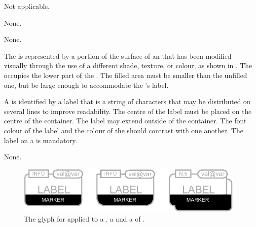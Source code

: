 \begin{glyphDescription}

\glyphSboTerm Not applicable.

\glyphIncoming
None.

\glyphOutgoing
None.

\glyphContainer
The  is represented by a portion of the surface of an  that has been modified visually through the use of a different shade, texture, or colour, as shown in .
The  occupies the lower part of the .
The filled area must be smaller than the unfilled one, but be large enough to accommodate the 's label.

\glyphLabel
A  is identified by a label that is  a string of characters that may be distributed on several lines to improve readability.
The centre of the label must be placed on the centre of the container.
The label may extend outside of the container.
The font colour of the label and the colour of the  should contrast with one another.
The label on a  is mandatory.

\glyphAux
None.

\end{glyphDescription}

\begin{figure}[H]
  \centering
  \includegraphics{images/build/labeled_clone_marker.pdf}
  \caption{The \PD glyph for  applied to a , a  and a  of .}
  \label{fig:labelledCloneMarker}
\end{figure}
